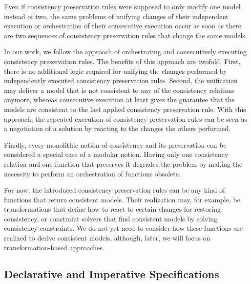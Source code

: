 Even if consistency preservation rules were supposed to only modify one model instead of two, the same problems of unifying changes of their independent execution or orchestration of their consecutive execution occur as soon as there are two sequences of consistency preservation rules that change the same models.

In our work, we follow the approach of orchestrating and consecutively executing consistency preservation rules.
The benefits of this approach are twofold. First, there is no additional logic required for unifying the changes performed by independently executed consistency preservation rules. 
Second, the unification may deliver a model that is not consistent to any of the consistency relations anymore, whereas consecutive execution at least gives the guarantee that the models are consistent to the last applied consistency preservation rule.
With this approach, the repeated execution of consistency preservation rules can be seen as a negotiation of a solution by reacting to the changes the others performed.

\begin{remark} 
Finally, every monolithic notion of consistency and its preservation can be considered a special case of a modular notion. Having only one consistency relation and one function that preserves it degrades the problem by making the necessity to perform an orchestration of functions obsolete.
\end{remark}

For now, the introduced consistency preservation rules can be any kind of functions that return consistent models. 
Their realization may, for example, be transformations that define how to react to certain changes for restoring consistency, or constraint solvers that find consistent models by solving consistency constraints. 
We do not yet need to consider how these functions are realized to derive consistent models, although, later, we will focus on transformation-based approaches.


\subsection{Declarative and Imperative Specifications}
\label{chap:correctness:notions_consistency:declarative_imperative}

